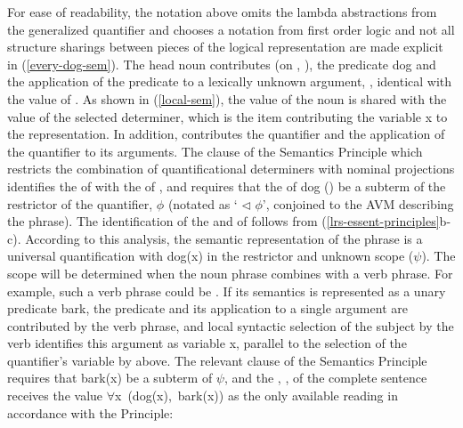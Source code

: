 \documentclass[output=paper]{langsci/langscibook}
\begin{document}
For ease of readability, the notation above omits the lambda abstractions from the generalized quantifier and chooses a notation from first order logic and not all structure sharings between pieces of the logical representation are made explicit in (\ref{every-dog-sem}). The head noun  contributes (on , ), the predicate {\normalfont \sffamily dog} and the application of the predicate to a lexically unknown argument, , identical with the  value of . As shown in (\ref{local-sem}), the  value of the noun is shared with the  value of the selected determiner, which is the item contributing the variable {\normalfont \sffamily x} to the representation. In addition,  contributes the quantifier and the application of the quantifier to its arguments. The clause of the Semantics Principle which restricts the combination of quantificational determiners with nominal projections identifies the  of  with the  of , and requires that the  of dog () be a subterm of the restrictor of the quantifier, $\phi$ (notated as ` $\triangleleft$ $\phi$', conjoined to the AVM describing the phrase). The identification of the  and  of  follows from (\ref{lrs-essent-principles}b-c). According to this analysis, the semantic representation of the phrase  is a universal quantification with {\normalfont \sffamily dog(x)} in the restrictor and unknown scope ($\psi$). The scope will be determined when the noun phrase combines with a verb phrase. For example, such a verb phrase could be . If its semantics is represented as a unary predicate {\normalfont \sffamily bark}, the predicate and its application to a single argument are contributed by the verb phrase, and local syntactic selection of the subject  by the verb  identifies this argument as variable {\normalfont \sffamily x}, parallel to the selection of the quantifier's variable by  above. The relevant clause of the Semantics Principle requires that {\normalfont \sffamily bark(x)} be a subterm of $\psi$, and the , , of the complete sentence receives the value \mbox{\normalfont \sffamily $\forall$x (dog(x), bark(x))} as the only available reading in accordance with the  Principle: %
\end{document}
